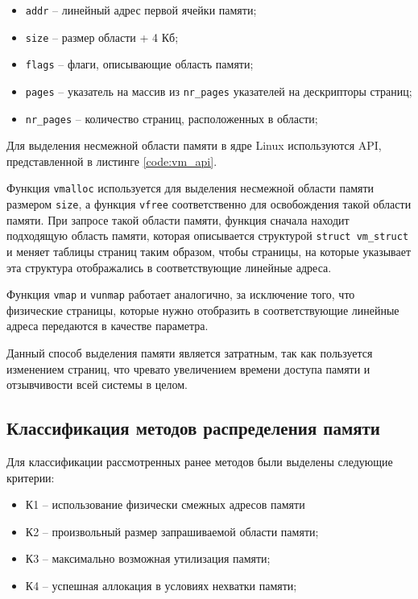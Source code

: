 \begin{itemize}
	\item \texttt{addr} -- линейный адрес первой ячейки памяти;
	\item \texttt{size} -- размер области + 4 Кб;
	\item \texttt{flags} -- флаги, описывающие область памяти;
	\item \texttt{pages} -- указатель на массив из \texttt{nr\_pages} указателей на дескрипторы страниц;
	\item \texttt{nr\_pages} -- количество страниц, расположенных в области;
\end{itemize}

Для выделения несмежной области памяти в ядре Linux используются API, представленной в листинге \ref{code:vm_api}.


Функция \texttt{vmalloc} используется для выделения несмежной области памяти размером \texttt{size}, а функция \texttt{vfree} соответственно для освобождения такой области памяти. При запросе такой области памяти, функция сначала находит подходящую область памяти, которая описывается структурой \texttt{struct vm\_struct} и меняет таблицы страниц таким образом, чтобы страницы, на которые указывает эта структура отображались в соответствующие линейные адреса. 

Функция \texttt{vmap} и \texttt{vunmap} работает аналогично, за исключение того, что физические страницы, которые нужно отобразить в соответствующие линейные адреса передаются в качестве параметра.

Данный способ выделения памяти является затратным, так как пользуется изменением страниц, что чревато увеличением времени доступа памяти и отзывчивости всей системы в целом.

\subsection{Классификация методов распределения памяти}

Для классификации рассмотренных ранее методов были выделены следующие критерии:

\begin{itemize}
	\item К1 -- использование физически смежных адресов памяти
	\item К2 -- произвольный размер запрашиваемой области памяти;
	\item К3 -- максимально возможная утилизация памяти;
	\item К4 -- успешная аллокация в условиях нехватки памяти;
\end{itemize}


